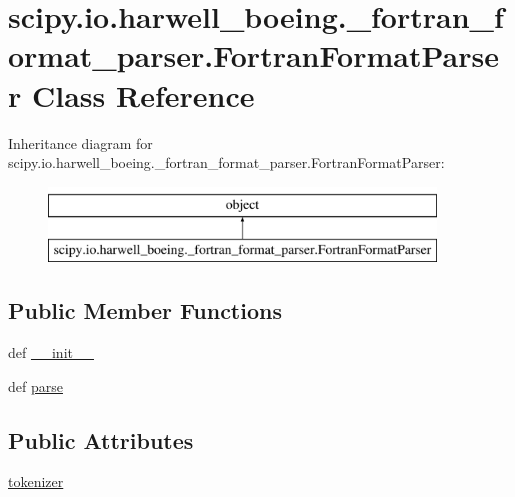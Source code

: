 \hypertarget{classscipy_1_1io_1_1harwell__boeing_1_1__fortran__format__parser_1_1FortranFormatParser}{}\section{scipy.\+io.\+harwell\+\_\+boeing.\+\_\+fortran\+\_\+format\+\_\+parser.\+Fortran\+Format\+Parser Class Reference}
\label{classscipy_1_1io_1_1harwell__boeing_1_1__fortran__format__parser_1_1FortranFormatParser}
Inheritance diagram for scipy.\+io.\+harwell\+\_\+boeing.\+\_\+fortran\+\_\+format\+\_\+parser.\+Fortran\+Format\+Parser\+:\begin{figure}[H]
\begin{center}
\leavevmode
\includegraphics[height=2.000000cm]{classscipy_1_1io_1_1harwell__boeing_1_1__fortran__format__parser_1_1FortranFormatParser}
\end{center}
\end{figure}
\subsection*{Public Member Functions}
\begin{DoxyCompactItemize}
\item 
def \hyperlink{classscipy_1_1io_1_1harwell__boeing_1_1__fortran__format__parser_1_1FortranFormatParser_a1ef12ae19890cc4b07195b8111977d81}{\+\_\+\+\_\+init\+\_\+\+\_\+}
\item 
def \hyperlink{classscipy_1_1io_1_1harwell__boeing_1_1__fortran__format__parser_1_1FortranFormatParser_a05c72b3907ed7ea9df7edba96e0c74c7}{parse}
\end{DoxyCompactItemize}
\subsection*{Public Attributes}
\begin{DoxyCompactItemize}
\item 
\hyperlink{classscipy_1_1io_1_1harwell__boeing_1_1__fortran__format__parser_1_1FortranFormatParser_a44b3aa28cceb99e2ab31d320091932b9}{tokenizer}
\end{DoxyCompactItemize}


